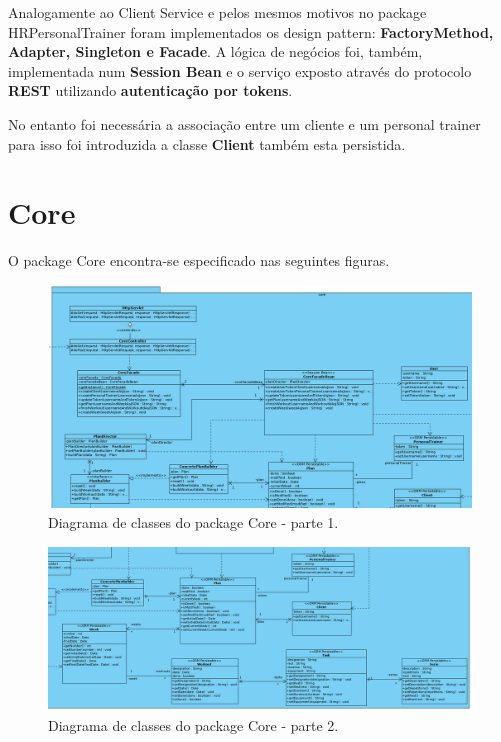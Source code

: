 \hspace{5mm} Analogamente ao Client Service e pelos mesmos motivos no package HRPersonalTrainer foram implementados os design pattern: \textbf{FactoryMethod, Adapter, Singleton e Facade}. A lógica de negócios foi, também, implementada num \textbf{Session Bean} e o serviço exposto através do protocolo \textbf{REST} utilizando \textbf{autenticação por tokens}.

\hspace{5mm} No entanto foi necessária a associação entre um cliente e um personal trainer para isso foi introduzida a classe \textbf{Client} também esta persistida.

\section{Core}

\hspace{5mm} O package Core encontra-se especificado nas seguintes figuras.

\begin{figure}[H]
    \centering
    \includegraphics[scale=0.35]{images/arquitetura/core-package-1.png}
    \caption{Diagrama de classes do package Core - parte 1.}
    \label{fig:interfaceperfilptbycliente}
\end{figure}


\begin{figure}[H]
    \centering
    \includegraphics[scale=0.325]{images/arquitetura/core-package-2.png}
    \caption{Diagrama de classes do package Core - parte 2.}
    \label{fig:interfaceperfilptbycliente}
\end{figure}

